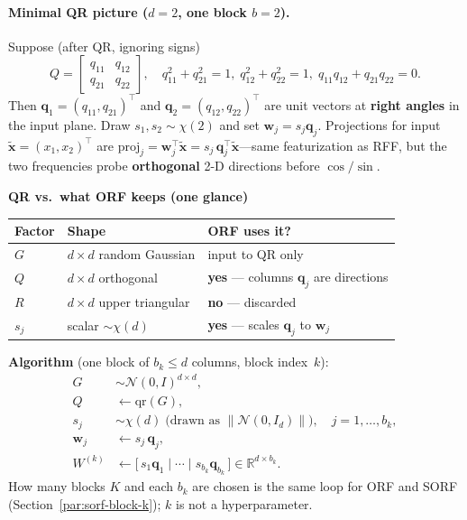 \documentclass[11pt]{article}
\begin{document}
\paragraph{Minimal QR picture ($d=2$, one block $b=2$).}
Suppose (after QR, ignoring signs)
\[
  Q = \begin{bmatrix} q_{11} & q_{12} \\ q_{21} & q_{22} \end{bmatrix},
  \quad
  q_{11}^2+q_{21}^2=1,\;
  q_{12}^2+q_{22}^2=1,\;
  q_{11}q_{12}+q_{21}q_{22}=0.
\]
Then $\mathbf q_1=(q_{11},q_{21})^{\top}$ and $\mathbf q_2=(q_{12},q_{22})^{\top}$ are unit vectors at
\textbf{right angles} in the input plane.
Draw $s_1,s_2\sim\chi(2)$ and set $\mathbf w_j=s_j\mathbf q_j$.
Projections for input $\tilde{\mathbf x}=(x_1,x_2)^{\top}$ are
$\mathrm{proj}_{j}=\mathbf w_j^{\top}\tilde{\mathbf x}=s_j\,\mathbf q_j^{\top}\tilde{\mathbf x}$---same
featurization as RFF, but the two frequencies probe \textbf{orthogonal} 2-D directions before $\cos/\sin$.

\begin{samebox}
\textbf{QR vs.\ what ORF keeps (one glance)}
\begin{center}
\renewcommand{\arraystretch}{1.3}
\begin{tabular}{@{}lll@{}}
\toprule
\textbf{Factor} & \textbf{Shape} & \textbf{ORF uses it?} \\
\midrule
$G$ & $d\times d$ random Gaussian & input to QR only \\
$Q$ & $d\times d$ orthogonal & \textbf{yes} --- columns $\mathbf q_j$ are directions \\
$R$ & $d\times d$ upper triangular & \textbf{no} --- discarded \\
$s_j$ & scalar $\sim\chi(d)$ & \textbf{yes} --- scales $\mathbf q_j$ to $\mathbf w_j$ \\
\bottomrule
\end{tabular}
\end{center}
\end{samebox}

\textbf{Algorithm} (one block of $b_k\le d$ columns, block index~$k$):
\begin{align}
  G &\sim \mathcal N(0,I)^{d\times d}, \\
  Q &\leftarrow \mathrm{qr}(G), \\
  s_j &\sim \chi(d) \;\text{(drawn as $\|\mathcal N(0,I_d)\|$)}, \quad j=1,\ldots,b_k, \\
  \mathbf w_j &\leftarrow s_j\,\mathbf q_j, \\
  W^{(k)} &\leftarrow \bigl[\,s_1\mathbf q_1 \;\big|\; \cdots \;\big|\; s_{b_k}\mathbf q_{b_k}\,\bigr]
  \in \mathbb{R}^{d\times b_k}.
\end{align}
How many blocks $K$ and each $b_k$ are chosen is the same loop for ORF and SORF (Section~\ref{par:sorf-block-k}); $k$ is not a hyperparameter.
\end{document}
